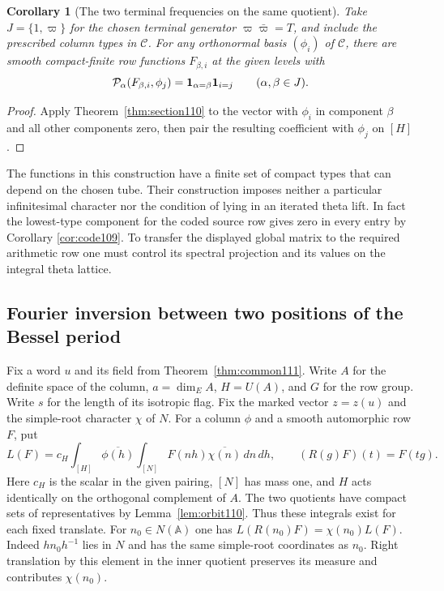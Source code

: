 \documentclass[a4paper,11pt]{article}
\newtheorem{corollary}[proposition]{Corollary}
\theoremstyle{definition}
\theoremstyle{remark}
\numberwithin{equation}{section}
\begin{document}
\begin{corollary}[The two terminal frequencies on the same quotient]\label{cor:gram110}
Take \(J=\{1,\varpi\}\) for the chosen terminal generator
\(\varpi\bar\varpi=T\), and include the prescribed column
types in \(\mathcal C\). For any orthonormal basis
\((\phi_i)\) of \(\mathcal C\), there are smooth compact-finite
row functions \(F_{\beta,i}\) at the given levels with
\[
           {\cal P}_\alpha(F_{\beta,i},\phi_j)
                 =\mathbf1_{\alpha=\beta}\mathbf1_{i=j}
                      \qquad(\alpha,\beta\in J).
\]
\end{corollary}
\begin{proof}
Apply Theorem~\ref{thm:section110} to the vector with \(\phi_i\)
in component \(\beta\) and all other components zero, then
pair the resulting coefficient with \(\phi_j\) on \([H]\).
\end{proof}

The functions in this construction have a finite set of compact
types that can depend on the chosen tube. Their construction
imposes neither a particular infinitesimal character nor the
condition of lying in an iterated theta lift. In fact the
lowest-type component for the coded source row gives zero in
every entry by Corollary \ref{cor:code109}. To transfer the displayed global matrix to the
required arithmetic row one must control its spectral projection
and its values on the integral theta lattice.

\subsection{Fourier inversion between two positions of the Bessel period}\label{sec:exchange336}
Fix a word \(u\) and its field from Theorem~\ref{thm:common111}.
Write \(A\) for the definite space of the column, \(a=\dim_E A\),
\(H=U(A)\), and \(G\) for the row group. Write \(s\) for the length
of its isotropic flag. Fix the marked vector \(z=z(u)\) and the
simple-root character \(\chi\) of \(N\). For a column \(\phi\) and
a smooth automorphic row \(F\), put
\[
 L(F)=c_H\int_{[H]}\overline{\phi(h)}
        \int_{[N]} F(nh)\overline{\chi(n)}\,dn\,dh ,
 \qquad (R(g)F)(t)=F(tg).
\]
Here \(c_H\) is the scalar in the given pairing, \([N]\) has mass
one, and \(H\) acts identically on the orthogonal complement of
\(A\). The two quotients have compact sets of representatives by
Lemma~\ref{lem:orbit110}. Thus these integrals exist for each
fixed translate. For \(n_0\in N(\mathbb A)\) one has
\(L(R(n_0)F)=\chi(n_0)L(F)\). Indeed \(hn_0h^{-1}\) lies in \(N\)
and has the same simple-root coordinates as \(n_0\). Right
translation by this element in the inner quotient preserves its
measure and contributes \(\chi(n_0)\).
\end{document}

